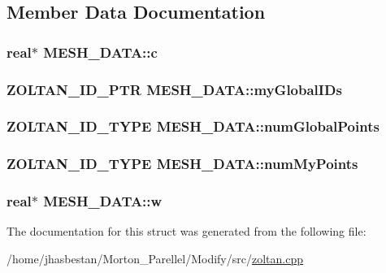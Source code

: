 \subsection{Member Data Documentation}
\hypertarget{structMESH__DATA_a8238c727c5259e5124dc1577e2d4f486}{
\subsubsection[{c}]{\setlength{\rightskip}{0pt plus 5cm}real$\ast$ {\bf MESH\_\-DATA::c}}}
\label{structMESH__DATA_a8238c727c5259e5124dc1577e2d4f486}
\hypertarget{structMESH__DATA_a483f28fc265f4b7cd24bec6d809cc7e6}{
\subsubsection[{myGlobalIDs}]{\setlength{\rightskip}{0pt plus 5cm}ZOLTAN\_\-ID\_\-PTR {\bf MESH\_\-DATA::myGlobalIDs}}}
\label{structMESH__DATA_a483f28fc265f4b7cd24bec6d809cc7e6}
\hypertarget{structMESH__DATA_a25c50153be30ddfd4e2631f9a5c2f2fb}{
\subsubsection[{numGlobalPoints}]{\setlength{\rightskip}{0pt plus 5cm}ZOLTAN\_\-ID\_\-TYPE {\bf MESH\_\-DATA::numGlobalPoints}}}
\label{structMESH__DATA_a25c50153be30ddfd4e2631f9a5c2f2fb}
\hypertarget{structMESH__DATA_afb64042a79ca9c51cec37b8f1a5d867d}{
\subsubsection[{numMyPoints}]{\setlength{\rightskip}{0pt plus 5cm}ZOLTAN\_\-ID\_\-TYPE {\bf MESH\_\-DATA::numMyPoints}}}
\label{structMESH__DATA_afb64042a79ca9c51cec37b8f1a5d867d}
\hypertarget{structMESH__DATA_adb92ab23a818023527c39a97ed998249}{
\subsubsection[{w}]{\setlength{\rightskip}{0pt plus 5cm}real$\ast$ {\bf MESH\_\-DATA::w}}}
\label{structMESH__DATA_adb92ab23a818023527c39a97ed998249}


The documentation for this struct was generated from the following file:\begin{DoxyCompactItemize}
\item 
/home/jhasbestan/Morton\_\-Parellel/Modify/src/\hyperlink{zoltan_8cpp}{zoltan.cpp}\end{DoxyCompactItemize}
